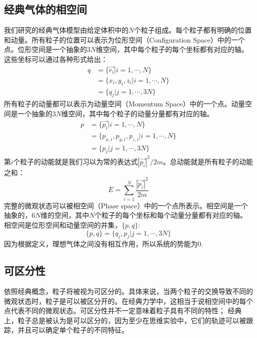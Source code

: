 \documentclass[UTF8]{ctexart}
\numberwithin{equation}{section}%
\numberwithin{figure}{section}%
\begin{document}
    \subsection{经典气体的相空间}
    我们研究的经典气体模型由给定体积中的$N$个粒子组成。每个粒子都有明确的位置和动量。所有粒子的位置可以表示为位形空间（Configuration Space）中的一个点。位形空间是一个抽象的$3N$维空间，其中每个粒子的每个坐标都有对应的轴。这些坐标可以通过各种形式给出：
    \begin{equation}
    \begin{aligned}
    q&=\{\vec{r_i}|i=1,\cdots,N\}\\
     &=\{x_i,y_i,z_i|i=1,\cdots ,N\}\\
     &=\{q_j|j=1,\cdots ,3N\}
    \end{aligned}
    \end{equation}
    所有粒子的动量都可以表示为动量空间（Momentum Space）中的一个点。动量空间是一个抽象的$3N$维空间，其中每个粒子的动量分量都有对应的轴。
    \begin{equation}
    \begin{aligned}
        p&=\{\vec{p_i}|i=1,\cdots ,N\}\\
         &=\{p_{x,i},p_{y,i},p_{z,i}|i=1,\cdots ,N\}\\
         &=\{p_j|j=1,\cdots ,3N\}
    \end{aligned}
    \end{equation}
    第$i$个粒子的动能就是我们习以为常的表达式$|\vec{p_i}|^2/2m$。总动能就是所有粒子的动能之和：
    \begin{equation}
        E=\sum^{N}_{i=1}\frac{|\vec{p_i}|^2}{2m}
    \end{equation}
    完整的微观状态可以被相空间（Phase space）中的一个点所表示。相空间是一个抽象的，$6N$维的空间，其中$N$个粒子的每个坐标和每个动量分量都有对应的轴。相空间是位形空间和动量空间的并集，$\{p,q\}$:
    \begin{equation}
        \{p,q\}=\{q_j,p_j|j=1,\cdots ,3N\}
    \end{equation}
    因为根据定义，理想气体之间没有相互作用，所以系统的势能为0.
    \subsection{可区分性}
    依照经典概念，粒子将被视为可区分的。具体来说，当两个粒子的交换导致不同的微观状态时，粒子是可以被区分开的。在经典力学中，这相当于说相空间中的每个点代表不同的微观状态。可区分性并不一定意味着粒子具有不同的特性；
    经典上，粒子总是被认为是可以区分的，因为至少在思维实验中，它们的轨迹可以被跟踪，并且可以确定单个粒子的不同特征。
    
\end{document}
